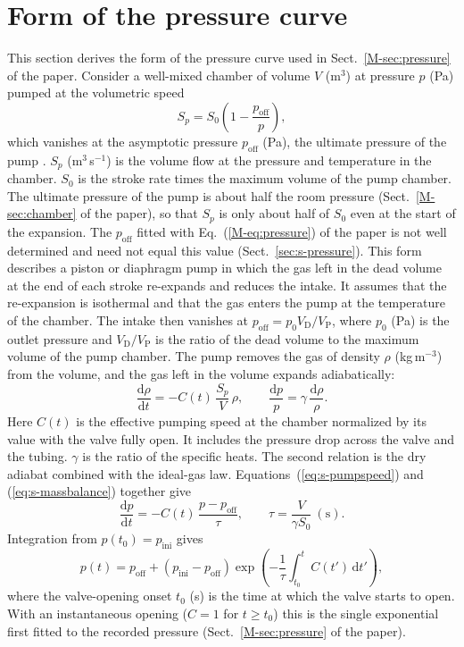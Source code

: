 \documentclass[12pt]{article}
\begin{document}
\section{Form of the pressure curve}
\label{sec:s-pform}
This section derives the form of the pressure curve used in Sect.~\ref{M-sec:pressure} of the paper.
Consider a well-mixed chamber of volume $V$ (m$^3$) at pressure $p$ (Pa) pumped at the volumetric speed
\begin{equation}
S_p = S_0\left(1 - \frac{p_\mathrm{off}}{p}\right),
\label{eq:s-pumpspeed}
\end{equation}
which vanishes at the asymptotic pressure $p_\mathrm{off}$ (Pa), the ultimate pressure of the pump
\citep[pp.~87 and 91--92]{eckle1998diaphragm}. $S_p$ (m$^3$\,s$^{-1}$) is the volume flow at the pressure
and temperature in the chamber. $S_0$ is the stroke rate times the maximum
volume of the pump chamber. The ultimate pressure of the pump is about half the room pressure
(Sect.~\ref{M-sec:chamber} of the paper), so that $S_p$ is only about half of $S_0$ even at the start
of the expansion. The $p_\mathrm{off}$ fitted with Eq.~(\ref{M-eq:pressure}) of the paper is not well
determined and need not equal this value (Sect.~\ref{sec:s-pressure}).
This form describes a piston or diaphragm pump in which the gas left in the dead volume at the end of
each stroke re-expands and reduces the intake.
It assumes that the re-expansion is isothermal and that the gas enters the pump at the temperature
of the chamber. The intake then vanishes at $p_\mathrm{off} = p_0 V_\mathrm{D}/V_\mathrm{P}$, where
$p_0$ (Pa) is the outlet pressure and $V_\mathrm{D}/V_\mathrm{P}$ is the ratio of the dead volume to
the maximum volume of the pump chamber.
The pump removes the gas of density $\rho$ (kg\,m$^{-3}$) from the volume, and the gas left in the
volume expands adiabatically:
\begin{equation}
\frac{\mathrm{d}\rho}{\mathrm{d}t} = -C(t)\,\frac{S_p}{V}\,\rho, \qquad
\frac{\mathrm{d}p}{p} = \gamma\,\frac{\mathrm{d}\rho}{\rho}.
\label{eq:s-massbalance}
\end{equation}
Here $C(t)$ is the effective pumping speed at the chamber normalized by its value
with the valve fully open. It includes the pressure drop across the valve and the tubing.
$\gamma$ is the ratio of the specific heats. The second relation is the dry adiabat
\citep[Eq.~20]{moteki2013new} combined with the ideal-gas law.
Equations~(\ref{eq:s-pumpspeed}) and (\ref{eq:s-massbalance}) together give
\begin{equation}
\frac{\mathrm{d}p}{\mathrm{d}t} = -C(t)\,\frac{p - p_\mathrm{off}}{\tau}, \qquad
\tau = \frac{V}{\gamma S_0}\ (\mathrm{s}).
\end{equation}
Integration from $p(t_0) = p_\mathrm{ini}$ gives
\begin{equation}
p(t) = p_\mathrm{off} + (p_\mathrm{ini} - p_\mathrm{off})
\exp\!\left(-\frac{1}{\tau}\int_{t_0}^{t} C(t')\,\mathrm{d}t'\right),
\label{eq:s-singleexp}
\end{equation}
where the valve-opening onset $t_0$ (s) is the time at which the valve starts to open.
With an instantaneous opening ($C = 1$ for $t \ge t_0$) this is the single exponential first fitted to the
recorded pressure (Sect.~\ref{M-sec:pressure} of the paper).
\end{document}
